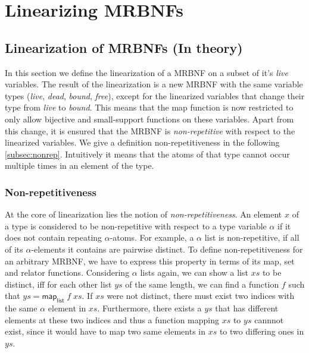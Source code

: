 
\chapter{Linearizing MRBNFs}
\label{chapter:methodology}

\section{Linearization of MRBNFs (In theory)}
  In this section we define the linearization of a \ac{MRBNF} on a subset of it's \textit{live} variables. The result of the linearization is a new \ac{MRBNF} with the same variable types (\textit{live}, \textit{dead}, \textit{bound}, \textit{free}), except for the linearized variables that change their type from \textit{live} to \textit{bound}. This means that the map function is now restricted to only allow bijective and small-support functions on these variables. Apart from this change, it is ensured that the \ac{MRBNF} is \textit{non-repetitive} with respect to the linearized variables. We give a definition non-repetitiveness in the following \autoref{subsec:nonrep}. Intuitively it means that the atoms of that type cannot occur multiple times in an element of the type.

  \subsection{Non-repetitiveness}
  \label{subsec:nonrep}
    At the core of linearization lies the notion of \textit{non-repetitiveness}. An element $x$ of a type is considered to be non-repetitive with respect to a type variable $\alpha$ if it does not contain repeating $\alpha$-atoms. For example, a \textsf{$\alpha$ list} is non-repetitive, if all of its $\alpha$-elements it contains are pairwise distinct. 
    To define non-repetitiveness for an arbitrary \ac{MRBNF}, we have to express this property in terms of its map, set and relator functions. Considering \textsf{$\alpha$ list}s again, we can show a list $xs$ to be distinct, iff for each other list $ys$ of the same length, we can find a function $f$ such that $ys = \textsf{map}_\textsf{list}\; f\; xs$. If $xs$ were not distinct, there must exist two indices with the same $\alpha$ element in $xs$. Furthermore, there exists a $ys$ that has different elements at these two indices and thus a function mapping $xs$ to $ys$ cannnot exist, since it would have to map two same elements in $xs$ to two differing ones in $ys$. 


